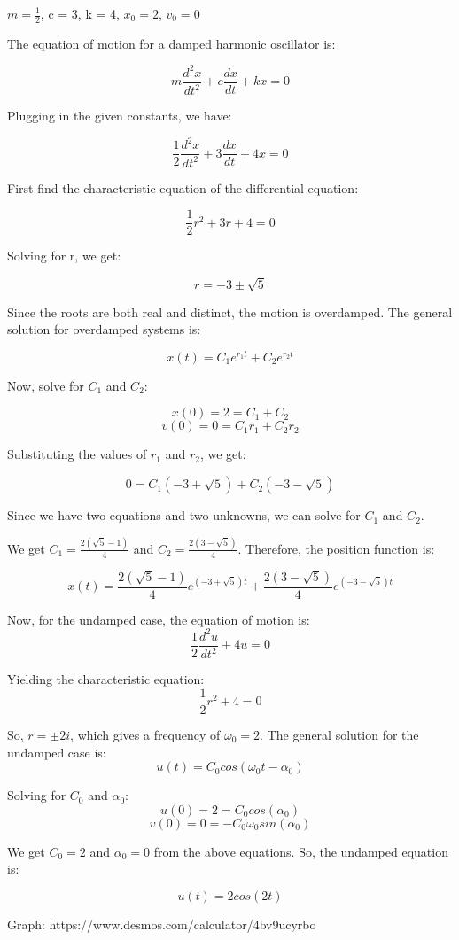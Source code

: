 \documentclass{article}
\begin{document}
$m = \frac{1}{2}$, c = 3, k = 4, $x_0 = 2$, $v_0 = 0$

The equation of motion for a damped harmonic oscillator is:

\[m \frac{d^2 x}{d t^2} + c \frac{dx}{dt} + kx = 0\]

Plugging in the given constants, we have:

\[\frac{1}{2} \frac{d^2 x}{d t^2} + 3 \frac{dx}{dt} + 4x = 0\]

First find the characteristic equation of the differential equation:

\[\frac{1}{2} r^2 + 3r + 4 = 0\]

Solving for r, we get:

\[r = -3 \pm \sqrt{5}\]

Since the roots are both real and distinct, the motion is overdamped.
The general solution for overdamped systems is:

\[x(t) = C_1 e^{r_1 t} + C_2 e^{r_2 t}\]

Now, solve for $C_1$ and $C_2$:

\[x(0) = 2 = C_1 + C_2\]
\[v(0) = 0 = C_1 r_1 + C_2 r_2\]

Substituting the values of $r_1$ and $r_2$, we get:

\[0 = C_1 (-3 + \sqrt{5}) + C_2 (-3 - \sqrt{5})\]

Since we have two equations and two unknowns, we can solve for $C_1$ and $C_2$.

We get $C_1 = \frac{2(\sqrt{5} - 1)}{4}$ and $C_2 = \frac{2(3-\sqrt{5})}{4}$.
Therefore, the position function is:

\[x(t) = \frac{2(\sqrt{5} - 1)}{4} e^{(-3 + \sqrt{5})t} + \frac{2(3-\sqrt{5})}{4} e^{(-3 - \sqrt{5})t}\]

Now, for the undamped case, the equation of motion is:
\[\frac{1}{2} \frac{d^2 u}{d t^2} + 4u = 0\]

Yielding the characteristic equation:
\[\frac{1}{2}r^2 + 4 = 0\]

So, $r = \pm 2i$, which gives a frequency of $\omega_0 = 2$.
The general solution for the undamped case is:
\[u(t) = C_0 cos(\omega_0 t - \alpha_0)\]

Solving for $C_0$ and $\alpha_0$:
\[u(0) = 2 = C_0 cos(\alpha_0)\]
\[v(0) = 0 = -C_0 \omega_0 sin(\alpha_0)\]

We get $C_0 = 2$ and $\alpha_0 = 0$ from the above equations.
So, the undamped equation is:

\[u(t) = 2cos(2t)\]


Graph: https://www.desmos.com/calculator/4bv9ucyrbo
\end{document}
